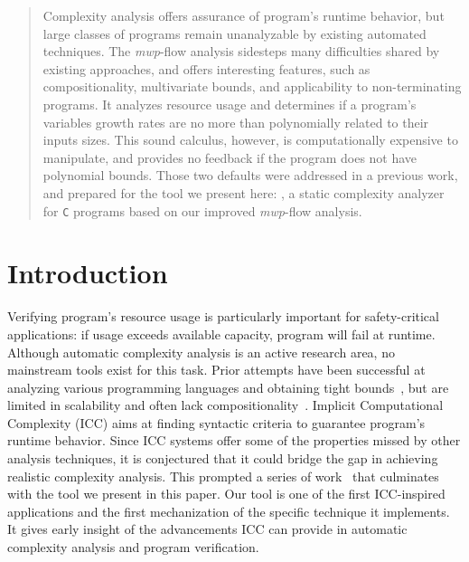 {{    


    \maketitle

    \begin{abstract}
        Complexity analysis offers assurance of program's runtime behavior, but large classes of programs remain unanalyzable by existing automated techniques.
        The \emph{mwp}-flow analysis sidesteps many difficulties shared by existing approaches, and offers interesting features, such as compositionality, multivariate bounds, and applicability to non-terminating programs.
        It analyzes resource usage and determines if a program's variables growth rates are no more than polynomially related to their inputs sizes.
        This sound calculus, however, is computationally expensive to manipulate, and provides no feedback if the program does not have polynomial bounds.
        Those two defaults were addressed in a previous work, and prepared for the tool we present here: \pymwp, a static complexity analyzer for \texttt{C} programs based on our improved \emph{mwp}-flow analysis.
    \end{abstract}

    \section{Introduction}
    \label{sec:intro}

    Verifying program's resource usage is particularly important for safety-critical applications:
    if usage exceeds available capacity, program will fail at runtime.
    Although automatic complexity analysis is an active research area, no mainstream tools exist for this task.
    Prior attempts have been successful at \eg analyzing various programming languages and obtaining tight bounds~\cite{giesl2017,hainry2021,Hoffmann2012c}, but are limited in scalability and often lack compositionality~\cite{Carbonneaux2015}.
    Implicit Computational Complexity (ICC) \cite{DalLago2012a} aims at finding syntactic criteria to guarantee program's runtime behavior.
    Since ICC systems offer some of the properties missed by other analysis techniques, it is conjectured that it could bridge the gap in achieving realistic complexity analysis.
    This prompted a series of work~\cite{Aubert2022b,Aubert2022g} that culminates with the tool we present in this paper.
    Our tool is one of the first ICC-inspired applications and the first mechanization of the specific technique it implements.
    It gives early insight of the advancements ICC can provide in automatic complexity analysis and program verification.

}}
